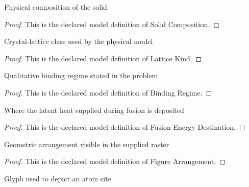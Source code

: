 \begin{definition}
  \label{def:physics:phyx-mini-0625:phyxminiproblems-problemphyxmini0625-solidcomposition}
  Physical composition of the solid
\end{definition}
\begin{proof}
  This is the declared model definition of Solid Composition.
\end{proof}
\begin{definition}
  \label{def:physics:phyx-mini-0625:phyxminiproblems-problemphyxmini0625-latticekind}
  Crystal-lattice class used by the physical model
\end{definition}
\begin{proof}
  This is the declared model definition of Lattice Kind.
\end{proof}
\begin{definition}
  \label{def:physics:phyx-mini-0625:phyxminiproblems-problemphyxmini0625-bindingregime}
  Qualitative binding regime stated in the problem
\end{definition}
\begin{proof}
  This is the declared model definition of Binding Regime.
\end{proof}
\begin{definition}
  \label{def:physics:phyx-mini-0625:phyxminiproblems-problemphyxmini0625-fusionenergydestination}
  Where the latent heat supplied during fusion is deposited
\end{definition}
\begin{proof}
  This is the declared model definition of Fusion Energy Destination.
\end{proof}
\begin{definition}
  \label{def:physics:phyx-mini-0625:phyxminiproblems-problemphyxmini0625-figurearrangement}
  Geometric arrangement visible in the supplied raster
\end{definition}
\begin{proof}
  This is the declared model definition of Figure Arrangement.
\end{proof}
\begin{definition}
  \label{def:physics:phyx-mini-0625:phyxminiproblems-problemphyxmini0625-siteglyph}
  Glyph used to depict an atom site
\end{definition}

